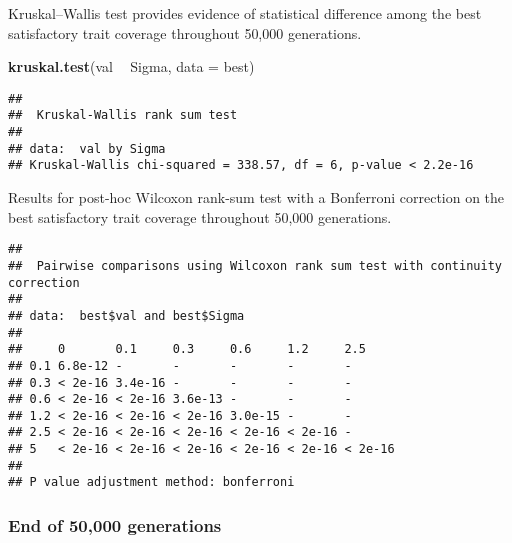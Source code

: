 \documentclass[]{book}
\newenvironment{Shaded}{\begin{snugshade}}{\end{snugshade}}
\newcommand{\DataTypeTok}[1]{\textcolor[rgb]{0.13,0.29,0.53}{#1}}
\newcommand{\KeywordTok}[1]{\textcolor[rgb]{0.13,0.29,0.53}{\textbf{#1}}}
\newcommand{\NormalTok}[1]{#1}
\newcommand{\OperatorTok}[1]{\textcolor[rgb]{0.81,0.36,0.00}{\textbf{#1}}}
\newcommand{\OtherTok}[1]{\textcolor[rgb]{0.56,0.35,0.01}{#1}}
\newcommand{\StringTok}[1]{\textcolor[rgb]{0.31,0.60,0.02}{#1}}
\begin{document}
Kruskal--Wallis test provides evidence of statistical difference among the best satisfactory trait coverage throughout 50,000 generations.

\begin{Shaded}
\begin{Highlighting}[]
\KeywordTok{kruskal.test}\NormalTok{(val }\OperatorTok{~}\StringTok{ }\NormalTok{Sigma, }\DataTypeTok{data =}\NormalTok{ best)}
\end{Highlighting}
\end{Shaded}

\begin{verbatim}
## 
##  Kruskal-Wallis rank sum test
## 
## data:  val by Sigma
## Kruskal-Wallis chi-squared = 338.57, df = 6, p-value < 2.2e-16
\end{verbatim}

Results for post-hoc Wilcoxon rank-sum test with a Bonferroni correction on the best satisfactory trait coverage throughout 50,000 generations.

\begin{Shaded}
\end{Shaded}

\begin{verbatim}
## 
##  Pairwise comparisons using Wilcoxon rank sum test with continuity correction 
## 
## data:  best$val and best$Sigma 
## 
##     0       0.1     0.3     0.6     1.2     2.5    
## 0.1 6.8e-12 -       -       -       -       -      
## 0.3 < 2e-16 3.4e-16 -       -       -       -      
## 0.6 < 2e-16 < 2e-16 3.6e-13 -       -       -      
## 1.2 < 2e-16 < 2e-16 < 2e-16 3.0e-15 -       -      
## 2.5 < 2e-16 < 2e-16 < 2e-16 < 2e-16 < 2e-16 -      
## 5   < 2e-16 < 2e-16 < 2e-16 < 2e-16 < 2e-16 < 2e-16
## 
## P value adjustment method: bonferroni
\end{verbatim}

\hypertarget{end-of-50000-generations-26}{%
\subsubsection{End of 50,000 generations}\label{end-of-50000-generations-26}}
\end{document}
